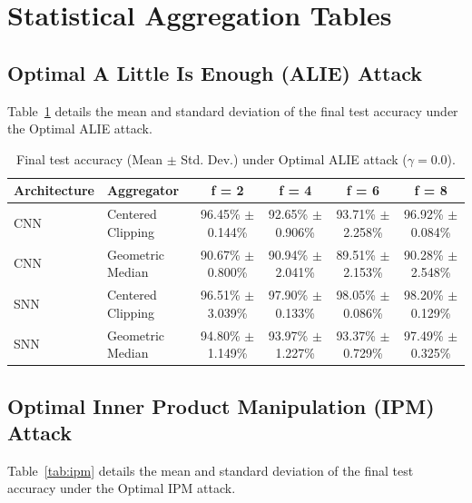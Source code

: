 \documentclass{article}
\begin{document}
\newpage

\section{Statistical Aggregation Tables}

\subsection{Optimal A Little Is Enough (ALIE) Attack}
Table~\ref{tab:alie} details the mean and standard deviation of the final test accuracy under the Optimal ALIE attack.

\begin{table}[htbp]
    \centering
    \caption{Final test accuracy (Mean $\pm$ Std. Dev.) under Optimal ALIE attack ($\gamma=0.0$).}
    \label{tab:alie}
    \begin{tabular}{llcccc}
        \toprule
        \textbf{Architecture} & \textbf{Aggregator} & \textbf{f = 2} & \textbf{f = 4} & \textbf{f = 6} & \textbf{f = 8} \\
        \midrule
        CNN & Centered Clipping & 96.45\% $\pm$ 0.144\% & 92.65\% $\pm$ 0.906\% & 93.71\% $\pm$ 2.258\% & 96.92\% $\pm$ 0.084\% \\
        CNN & Geometric Median & 90.67\% $\pm$ 0.800\% & 90.94\% $\pm$ 2.041\% & 89.51\% $\pm$ 2.153\% & 90.28\% $\pm$ 2.548\% \\
        \midrule
        SNN & Centered Clipping & 96.51\% $\pm$ 3.039\% & 97.90\% $\pm$ 0.133\% & 98.05\% $\pm$ 0.086\% & 98.20\% $\pm$ 0.129\% \\
        SNN & Geometric Median & 94.80\% $\pm$ 1.149\% & 93.97\% $\pm$ 1.227\% & 93.37\% $\pm$ 0.729\% & 97.49\% $\pm$ 0.325\% \\
        \bottomrule
    \end{tabular}
\end{table}

\subsection{Optimal Inner Product Manipulation (IPM) Attack}
Table~\ref{tab:ipm} details the mean and standard deviation of the final test accuracy under the Optimal IPM attack.
\end{document}
